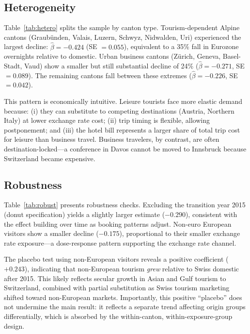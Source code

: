 \documentclass[12pt]{article}
\begin{document}
\subsection{Heterogeneity}



Table~\ref{tab:hetero} splits the sample by canton type. Tourism-dependent Alpine cantons (Graubünden, Valais, Luzern, Schwyz, Nidwalden, Uri) experienced the largest decline: $\hat{\beta} = -0.424$ (SE $= 0.055$), equivalent to a 35\% fall in Eurozone overnights relative to domestic. Urban business cantons (Zürich, Geneva, Basel-Stadt, Vaud) show a smaller but still substantial decline of 24\% ($\hat{\beta} = -0.271$, SE $= 0.089$). The remaining cantons fall between these extremes ($\hat{\beta} = -0.226$, SE $= 0.042$).

This pattern is economically intuitive. Leisure tourists face more elastic demand because: (i) they can substitute to competing destinations (Austria, Northern Italy) at lower exchange rate cost; (ii) trip timing is flexible, allowing postponement; and (iii) the hotel bill represents a larger share of total trip cost for leisure than business travel. Business travelers, by contrast, are often destination-locked---a conference in Davos cannot be moved to Innsbruck because Switzerland became expensive.

\subsection{Robustness}



Table~\ref{tab:robust} presents robustness checks. Excluding the transition year 2015 (donut specification) yields a slightly larger estimate ($-0.290$), consistent with the effect building over time as booking patterns adjust. Non-euro European visitors show a smaller decline ($-0.175$), proportional to their smaller exchange rate exposure---a dose-response pattern supporting the exchange rate channel.

The placebo test using non-European visitors reveals a positive coefficient ($+0.243$), indicating that non-European tourism \textit{grew} relative to Swiss domestic after 2015. This likely reflects secular growth in Asian and Gulf tourism to Switzerland, combined with partial substitution as Swiss tourism marketing shifted toward non-European markets. Importantly, this positive ``placebo'' does not undermine the main result: it reflects a separate trend affecting origin groups differentially, which is absorbed by the within-canton, within-exposure-group design.
\end{document}
